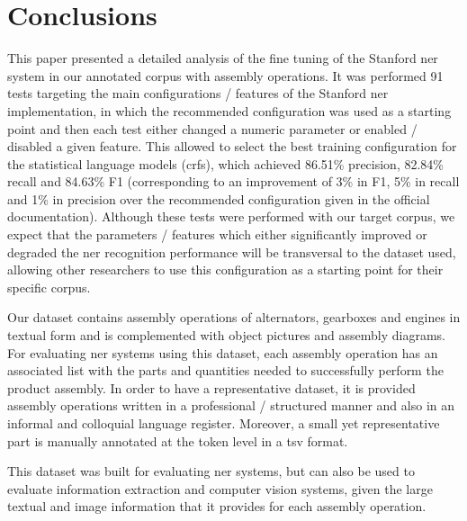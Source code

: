 \section{Conclusions}\label{sec:conclusions}

This paper presented a detailed analysis of the fine tuning of the Stanford \gls{ner} system in our annotated corpus with assembly operations. It was performed 91 tests targeting the main configurations / features of the Stanford \gls{ner} implementation, in which the recommended configuration was used as a starting point and then each test either changed a numeric parameter or enabled / disabled a given feature. This allowed to select the best training configuration for the statistical language models (\glspl{crf}), which achieved 86.51\% precision, 82.84\% recall and 84.63\% F1 (corresponding to an improvement of 3\% in F1, 5\% in recall and 1\% in precision over the recommended configuration given in the official documentation). Although these tests were performed with our target corpus, we expect that the parameters / features which either significantly improved or degraded the \gls{ner} recognition performance will be transversal to the dataset used, allowing other researchers to use this configuration as a starting point for their specific corpus.

Our dataset contains assembly operations of alternators, gearboxes and engines in textual form and is complemented with object pictures and assembly diagrams. For evaluating \gls{ner} systems using this dataset, each assembly operation has an associated list with the parts and quantities needed to successfully perform the product assembly. In order to have a representative dataset, it is provided assembly operations written in a professional / structured manner and also in an informal and colloquial language register. Moreover, a small yet representative part is manually annotated at the token level in a \gls{tsv} format.

This dataset was built for evaluating \gls{ner} systems, but can also be used to evaluate information extraction and computer vision systems, given the large textual and image information that it provides for each assembly operation.
